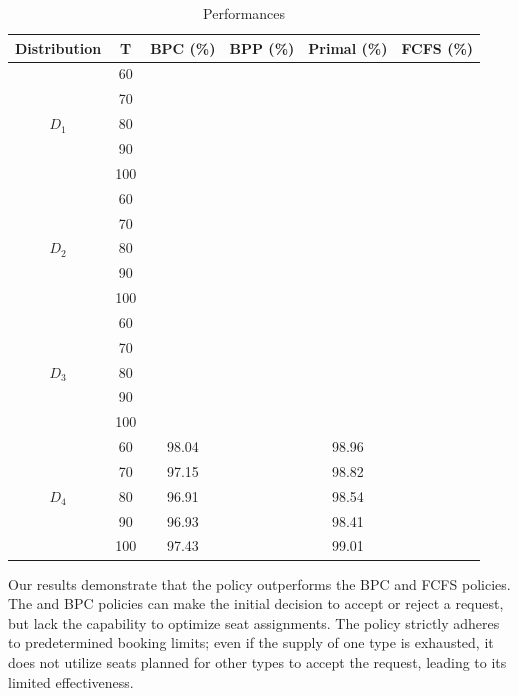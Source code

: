 \begin{table}[h]
  \centering
  \caption{Performances}\label{tab_perf}
  \begin{tabular}{cccccc}
  \hline
  \hline
  Distribution & T & BPC (\%) & BPP (\%) & Primal (\%) &  FCFS (\%) \\
  \hline
  \multirow{5}{*}{$D_1$} & 60 &   &  &   &  \\
  & 70    &  &  &  &   \\
  & 80    &  &  &  &   \\
  & 90    &  &  &  &   \\
  & 100   &  &  &  &  \\
  \hline
  \multirow{5}{*}{$D_2$} & 60  &  &  & &   \\
     & 70  &  &  &  &   \\
     & 80  &  &  &  &   \\
     & 90  &  &  &  &  \\
     & 100 &  &  &  &  \\ 
  \hline
  \multirow{5}{*}{$D_3$} & 60  &  &  &  &   \\
  & 70  &  &  &  &  \\
  & 80  &  &  &  &   \\
  & 90  &  &  &  &   \\
  & 100  &  &  &  &   \\
    \hline
    \multirow{5}{*}{$D_4$} & 60  & 98.04 &  & 98.96 & \\
     & 70  & 97.15 &  & 98.82 &  \\
     & 80  & 96.91 &  & 98.54 &  \\
     & 90  & 96.93 &  & 98.41 &  \\
     & 100 & 97.43 &  & 99.01 &  \\
  \hline
  \hline
  \end{tabular}
\end{table}

Our results demonstrate that the  policy outperforms the BPC and FCFS policies. The  and BPC policies can make the initial decision to accept or reject a request, but lack the capability to optimize seat assignments. The  policy strictly adheres to predetermined booking limits; even if the supply of one type is exhausted, it does not utilize seats planned for other types to accept the request, leading to its limited effectiveness.


